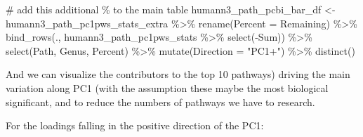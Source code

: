 \documentclass[
  letterpaper,
]{book}
\newenvironment{Shaded}{}{}
\newcommand{\AttributeTok}[1]{\textcolor[rgb]{0.84,0.23,0.29}{#1}}
\newcommand{\CommentTok}[1]{\textcolor[rgb]{0.42,0.45,0.49}{#1}}
\newcommand{\FunctionTok}[1]{\textcolor[rgb]{0.44,0.26,0.76}{#1}}
\newcommand{\NormalTok}[1]{\textcolor[rgb]{0.14,0.16,0.18}{#1}}
\newcommand{\OtherTok}[1]{\textcolor[rgb]{0.44,0.26,0.76}{#1}}
\newcommand{\SpecialCharTok}[1]{\textcolor[rgb]{0.00,0.36,0.77}{#1}}
\newcommand{\StringTok}[1]{\textcolor[rgb]{0.01,0.18,0.38}{#1}}
\begin{document}
\begin{Shaded}
\begin{Highlighting}[]
\CommentTok{\# add this additional \% to the main table}
\NormalTok{humann3\_path\_pcbi\_bar\_df }\OtherTok{\textless{}{-}}\NormalTok{ humann3\_path\_pc1pws\_stats\_extra }\SpecialCharTok{\%\textgreater{}\%}
  \FunctionTok{rename}\NormalTok{(}\AttributeTok{Percent =}\NormalTok{ Remaining) }\SpecialCharTok{\%\textgreater{}\%}
  \FunctionTok{bind\_rows}\NormalTok{(., humann3\_path\_pc1pws\_stats }\SpecialCharTok{\%\textgreater{}\%}
              \FunctionTok{select}\NormalTok{(}\SpecialCharTok{{-}}\NormalTok{Sum)) }\SpecialCharTok{\%\textgreater{}\%}
  \FunctionTok{select}\NormalTok{(Path, Genus, Percent) }\SpecialCharTok{\%\textgreater{}\%}
  \FunctionTok{mutate}\NormalTok{(}\AttributeTok{Direction =} \StringTok{"PC1+"}\NormalTok{) }\SpecialCharTok{\%\textgreater{}\%}
  \FunctionTok{distinct}\NormalTok{()}
\end{Highlighting}
\end{Shaded}

And we can visualize the contributors to the top 10 pathways) driving
the main variation along PC1 (with the assumption these maybe the most
biological significant, and to reduce the numbers of pathways we have to
research.

For the loadings falling in the positive direction of the PC1:
\end{document}
